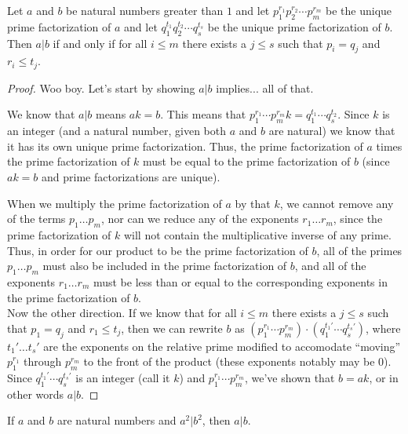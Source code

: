 \documentclass[../main.tex]{subfiles}
\begin{document}
\begin{thm} \label{2.12}
  Let $a$ and $b$ be natural numbers greater than $1$ and let $p_1^{r_1} p_2^{r_2} \cdots p_m^{r_m}$ be the unique prime factorization of $a$ and let $q_1^{t_1} q_2^{t_2} \cdots q_s^{t_s}$ be the unique prime factorization of $b$. Then $a | b$ if and only if for all $i \leq m$ there exists a $j \leq s$ such that $p_i = q_j$ and $r_i \leq t_j$.
\end{thm}

\begin{proof}
  Woo boy. Let's start by showing $a | b$ implies... all of that.

  We know that $a | b$ means $ak = b$. This means that $p_1^{r_1} \cdots p_m^{r_m} k = q_1^{t_1} \cdots q_s^{t_2}$. Since $k$ is an integer (and a natural number, given both $a$ and $b$ are natural) we know that it has its own unique prime factorization. Thus, the prime factorization of $a$ times the prime factorization of $k$ must be equal to the prime factorization of $b$ (since $ak = b$ and prime factorizations are unique).

  When we multiply the prime factorization of $a$ by that $k$, we cannot remove any of the terms $p_1 \ldots p_m$, nor can we reduce any of the exponents $r_1 \ldots r_m$, since the prime factorization of $k$ will not contain the multiplicative inverse of any prime. Thus, in order for our product to be the prime factorization of $b$, all of the primes $p_1 \ldots p_m$ must also be included in the prime factorization of $b$, and all of the exponents $r_1 \ldots r_m$ must be less than or equal to the corresponding exponents in the prime factorization of $b$. \\[0ex]

  Now the other direction. If we know that for all $i \leq m$ there exists a $j \leq s$ such that $p_1 = q_j$ and $r_1 \leq t_j$, then we can rewrite $b$ as $(p_1^{r_1} \cdots p_m^{r_m}) \cdot (q_1^{t_1'} \cdots q_s^{t_s'})$, where $t_1' \ldots t_s'$ are the exponents on the relative prime modified to accomodate ``moving'' $p_1^{r_1}$ through $p_m^{r_m}$ to the front of the product (these exponents notably may be $0$).
  Since $q_1^{t_1'} \cdots q_s^{t_s'}$ is an integer (call it $k$) and $p_1^{r_1} \cdots p_m^{r_m}$, we've shown that $b = ak$, or in other words $a | b$.
\end{proof}



\begin{thm} \label{2.13}
  If $a$ and $b$ are natural numbers and $a^2 | b^2$, then $a | b$.
\end{thm}
\end{document}
